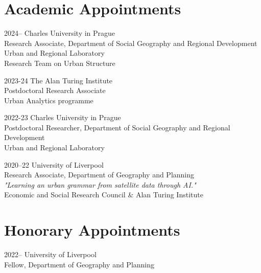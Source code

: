 \documentclass[12pt,a4paper]{report}
\begin{document}
    \section*{Academic Appointments}

    \begin{tablist}

        \item[2024--] \tab{}Charles University in Prague \\
                            Research Associate, Department of Social Geography and Regional Development \\
                            Urban and Regional Laboratory \\
                            Research Team on Urban Structure

        \item[2023-24] \tab{}The Alan Turing Institute \\
                            Postdoctoral Research Associate \\
                            Urban Analytics programme

         \item[2022-23] \tab{}Charles University in Prague \\
                            Postdoctoral Researcher, Department of Social Geography and Regional Development \\
                            Urban and Regional Laboratory

        \item[2020--22] \tab{}University of Liverpool \\
                            Research Associate, Department of Geography and Planning \\
                            \textit{"Learning an urban grammar from satellite data through AI."} \\
                            Economic and Social Research Council \& Alan Turing Institute

    \end{tablist}


    \section*{Honorary Appointments}

    \begin{tablist}

        \item[2022--] \tab{}University of Liverpool \\
                            Fellow, Department of Geography and Planning \\

    \end{tablist}
\end{document}
